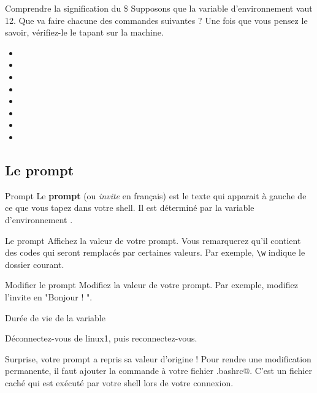 \documentclass[a4paper,11pt]{style-esi/td}
\begin{document}
		\begin{Exercice}{Comprendre la signification du \$}
			Supposons que la variable d'environnement  vaut 12.
			Que va faire chacune des commandes suivantes ?
			Une fois que vous pensez le savoir, 
			vérifiez-le le tapant sur la machine.
			\begin{itemize}
			\item {}
			\item {}
			\item {} 
			\item {} 
			\item {} 
			\item {} 
			\item {} 
			\item {} 
			\end{itemize}
		\end{Exercice}

	\subsection{Le prompt}

		\begin{theorie}{Prompt}
			Le \textbf{prompt} (ou \textit{invite} en français) 
			est le texte qui apparait à gauche
			de ce que vous tapez dans votre shell. 
			Il est déterminé par la variable d'environnement .
		\end{theorie}
			
		\begin{Experience}{Le prompt} 
			Affichez la valeur de votre prompt. 
			Vous remarquerez qu'il contient des codes qui seront 
			remplacés par certaines valeurs. 
			Par exemple, \verb_\w_ indique le dossier courant.
		\end{Experience}
			
		\begin{Exercice}{Modifier le prompt} 
			Modifiez la valeur de votre prompt.
			Par exemple, modifiez l'invite en "Bonjour ! ".
		\end{Exercice}	

		\begin{Tutoriel}{Durée de vie de la variable} 
			\vspace{-1em}
			\begin{steps}
			\item Déconnectez-vous de linux1, puis reconnectez-vous.	
			\end{steps}
			Surprise, votre prompt a repris sa valeur d'origine ! 
			Pour rendre une modification permanente, 
			il faut ajouter la commande à votre fichier \verb@.bashrc@.
			C'est un fichier caché qui est exécuté 
			par votre shell lors de votre connexion.
		\end{Tutoriel}
			
\end{document}
